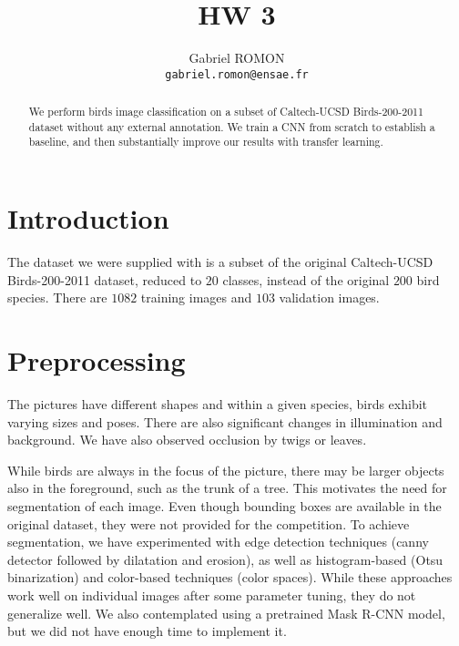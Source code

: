 \documentclass[10pt,twocolumn,letterpaper]{article}
\begin{document}
\title{HW 3}

\author{Gabriel ROMON\\
{\tt\small gabriel.romon@ensae.fr}
}

\maketitle

\begin{abstract}
   We perform birds image classification on a subset of Caltech-UCSD Birds-200-2011 dataset without any external annotation. We train a CNN from scratch to establish a baseline, and then substantially improve our results with transfer learning.
\end{abstract}

\section{Introduction}
The dataset we were supplied with is a subset of the original Caltech-UCSD Birds-200-2011 dataset, reduced to $20$ classes, instead of the original $200$ bird species. There are $1082$ training images and $103$ validation images. 

\section{Preprocessing}
The pictures have different shapes and within a given species, birds exhibit varying sizes and poses. There are also significant changes in illumination and background. We have also observed occlusion by twigs or leaves. 

While birds are always in the focus of the picture, there may be larger objects also in the foreground, such as the trunk of a tree. This motivates the need for segmentation of each image. Even though bounding boxes are available in the original dataset, they were not provided for the competition. To achieve segmentation, we have experimented with edge detection techniques (canny detector followed by dilatation and erosion), as well as histogram-based (Otsu binarization) and color-based techniques (color spaces). While these approaches work well on individual images after some parameter tuning, they do not generalize well. We also contemplated using a pretrained Mask R-CNN model, but we did not have enough time to implement it.
\end{document}
